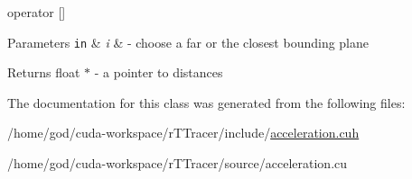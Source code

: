 operator \mbox{[}\mbox{]} 


\begin{DoxyParams}[1]{Parameters}
\mbox{\tt in}  & {\em i} & -\/ choose a far or the closest bounding plane \\
\hline
\end{DoxyParams}
\begin{DoxyReturn}{Returns}
float $\ast$ -\/ a pointer to distances 
\end{DoxyReturn}


The documentation for this class was generated from the following files\+:\begin{DoxyCompactItemize}
\item 
/home/god/cuda-\/workspace/r\+T\+Tracer/include/\hyperlink{acceleration_8cuh}{acceleration.\+cuh}\item 
/home/god/cuda-\/workspace/r\+T\+Tracer/source/acceleration.\+cu\end{DoxyCompactItemize}
